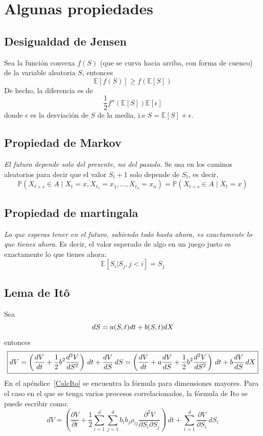 
\section{Algunas propiedades}

\subsection{Desigualdad de Jensen}
Sea la función convexa $f(S)$ (que se curva hacia arriba, con forma de cuenco) de la variable aleatoria $S$, entonces
\[\mathbb{E}[f(S)] \geq f(\mathbb{E}[S])\]
De hecho, la diferencia es de
\[\frac{1}{2}f''(\mathbb{E}[S])\mathbb{E}[\epsilon]\]
donde $\epsilon$ es la desviación de $S$ de la media, i.e $S=\mathbb{E}[S]+\epsilon$.


\subsection{Propiedad de Markov}
\textit{El futuro depende solo del presente, no del pasado.} Se usa en los caminos aleatorios para decir que el valor $S_t+1$ solo depende de $S_t$, es decir,
\[\mathbb{P}(X_{t+s} \in A \mid X_t = x, X_{t_1} = x_1, \ldots, X_{t_n} = x_n) 
= \mathbb{P}(X_{t+s} \in A \mid X_t = x)\]



\subsection{Propiedad de martingala}
\textit{Lo que esperas tener en el futuro, sabiendo todo hasta ahora, es exactamente lo que tienes ahora}. Es decir, el valor esperado de algo en un juego justo es exactamente lo que tienes ahora:
\[\mathbb{E}[S_i|S_j, j<i]=S_j\]



\subsection{Lema de Itô}
Sea
\[dS = a(S,t)dt + b(S,t)d\mathnormal{X}\]
entonces
\begin{equation}
    \boxed{dV = \left( \frac{dV}{dt} + \frac{1}{2}b^2\frac{d^2V}{dS^2} \right)\,dt + \frac{dV}{dS}\,dS = \left( \frac{dV}{dt} +  a\frac{dV}{dS} + \frac{1}{2}b^2\frac{d^2V}{dS^2} \right)\,dt + b\frac{dV}{dS}\,d\mathnormal{X}}
\end{equation}\label{Ito}
En el apéndice~\ref{CalcIto} se encuentra la fórmula para dimensiones mayores. Para el caso en el que se tenga varios procesos correlacionados, la fórmula de Ito se puede escribir como:
\begin{equation}\label{eq:ItoCorrelated}
    \boxed{dV = \left( \frac{\partial V}{\partial t} + \frac{1}{2} \sum_{i=1}^{d} \sum_{j=1}^{d} b_i b_j \rho_{ij} \frac{\partial^2 V}{\partial S_i \partial S_j} \right)\,dt + \sum_{i=1}^{d} \frac{\partial V}{\partial S_i}\,dS_i}
\end{equation}

